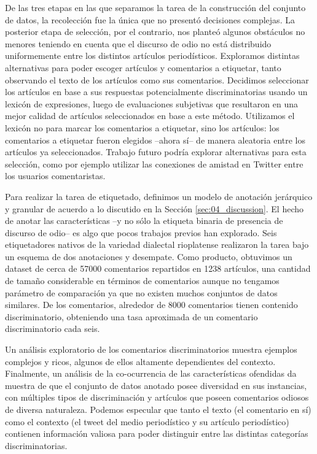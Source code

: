 De las tres etapas en las que separamos la tarea de la construcción del conjunto de datos, la recolección fue la única que no presentó decisiones complejas. La posterior etapa de selección, por el contrario, nos planteó algunos obstáculos no menores teniendo en cuenta que el discurso de odio no está distribuido uniformemente entre los distintos artículos periodísticos. Exploramos distintas alternativas para poder escoger artículos y comentarios a etiquetar, tanto observando el texto de los artículos como sus comentarios. Decidimos seleccionar los artículos en base a sus respuestas potencialmente discriminatorias usando un lexicón de expresiones, luego de evaluaciones subjetivas que resultaron en una mejor calidad de artículos seleccionados en base a este método. Utilizamos el lexicón no para marcar los comentarios a etiquetar, sino los artículos: los comentarios a etiquetar fueron elegidos --ahora sí-- de manera aleatoria entre los artículos ya seleccionados. Trabajo futuro podría explorar alternativas para esta selección, como por ejemplo utilizar las conexiones de amistad en Twitter entre los usuarios comentaristas.

Para realizar la tarea de etiquetado, definimos un modelo de anotación jerárquico y granular de acuerdo a lo discutido en la Sección \ref{sec:04_discussion}. El hecho de anotar las características --y no sólo la etiqueta binaria de presencia de discurso de odio-- es algo que pocos trabajos previos han explorado. Seis etiquetadores nativos de la variedad dialectal rioplatense realizaron la tarea bajo un esquema de dos anotaciones y desempate. Como producto, obtuvimos un dataset de cerca de \num{57000} comentarios repartidos en \num{1238} artículos, una cantidad de tamaño considerable en términos de comentarios aunque no tengamos parámetro de comparación ya que no existen muchos conjuntos de datos similares. De los comentarios, alrededor de \num{8000} comentarios tienen contenido discriminatorio, obteniendo una tasa aproximada de un comentario discriminatorio cada seis.


Un análisis exploratorio de los comentarios discriminatorios muestra ejemplos complejos y ricos, algunos de ellos altamente dependientes del contexto. Finalmente, un análisis de la co-ocurrencia de las características ofendidas da muestra de que el conjunto de datos anotado posee diversidad en sus instancias, con múltiples tipos de discriminación y artículos que poseen comentarios odiosos de diversa naturaleza. Podemos especular que tanto el texto (el comentario en sí) como el contexto (el tweet del medio periodístico y su artículo periodístico) contienen información valiosa para poder distinguir entre las distintas categorías discriminatorias.


